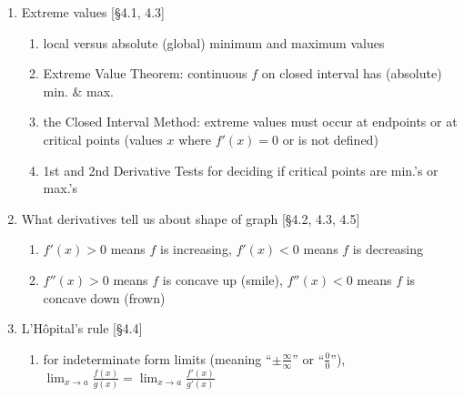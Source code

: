 \documentclass[11pt]{article}
\begin{document}
\begin{enumerate}
\item Extreme values [\S 4.1, 4.3]
\begin{enumerate}
\item local versus absolute (global) minimum and maximum values
\item Extreme Value Theorem: continuous $f$ on closed interval has (absolute) min. $\&$ max.
\item the Closed Interval Method: extreme values must occur at endpoints or at critical points (values $x$ where $f'(x)=0$ or is not defined)
\item 1st and 2nd Derivative Tests for deciding if critical points are min.'s or max.'s
\end{enumerate}

\item What derivatives tell us about shape of graph [\S 4.2, 4.3, 4.5]
\begin{enumerate}
\item $f'(x)>0$ means $f$ is increasing, $f'(x) <0$ means $f$ is decreasing
\item $f''(x)>0$ means $f$ is concave up (smile), $f''(x) <0$ means $f$ is concave down (frown)
\end{enumerate}

\item L'H\^{o}pital's rule [\S 4.4]
\begin{enumerate}
\item for indeterminate form limits (meaning ``$\pm \frac{\infty}{\infty}$'' or ``$\frac{0}{0}$''), $\displaystyle \lim_{x\to a} \frac{f(x)}{g(x)} = \lim_{x\to a} \frac{f'(x)}{g'(x)}$
\end{enumerate}

\end{enumerate}
\end{document}
